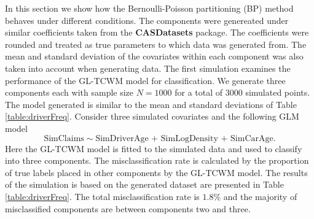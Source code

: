 \documentclass[11pt,letterpaper]{article}
\numberwithin{equation}{section}
\numberwithin{equation}{section}
\numberwithin{equation}{section}
\begin{document}
In this section we show how the Bernoulli-Poisson partitioning (BP) method  behaves under different conditions. The components were genereated under similar coefficients taken from the \textbf{CASDatasets} package. The coefficients were rounded and treated as true parameters to which data was generated from. The mean and standard deviation of the covariates within each component was also taken into account when generating data. The first simulation examines the performance of the GL-TCWM model for classification. We generate three components each with sample size $N=1000$ for a total of $3000$ simulated points.
The model generated is similar to the mean and standard deviations of Table \ref{table:driverFreq}. Consider three simulated covariates and the following GLM model
$$ \text{SimClaims} \sim \text{SimDriverAge + SimLogDensity + SimCarAge} . $$
 Here the GL-TCWM model is fitted to the simulated data and used to classify into three components. The misclassification rate is calculated by the proportion of true labels placed in other components by the GL-TCWM model.  The results of the simulation is based on the generated dataset are presented in Table \ref{table:driverFreq}. The total misclassification rate  is $1.8 \% $ and the majority of misclassified components are between components two and three.
\end{document}
